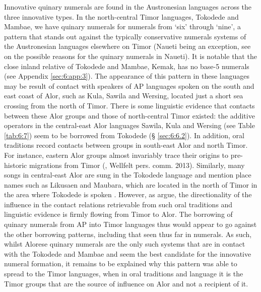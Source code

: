     Innovative quinary numerals are found in the Austronesian languages across the three innovative types. In the north-central Timor languages, Tokodede and Mambae, we have quinary numerals for numerals from `six' through `nine', a pattern that stands out against the typically conservative numerals systems of the Austronesian languages elsewhere on Timor (Naueti being an exception, see \citet{SchapperEtAl2013} on the possible reasons for the quinary numerals in Naueti). It is notable that the close inland relative of Tokodede and Mambae, Kemak, has no base-5 numerals (see Appendix \ref{sec:6:app:3}). The appearance of this pattern in these languages may be result of contact with speakers of AP languages spoken on the south and east coast of Alor, such as Kula, Sawila and Wersing, located just a short sea crossing from the north of Timor. There is some linguistic evidence that contacts between these Alor groups and those of north-central Timor existed: the additive operators in the central-east Alor languages Sawila, Kula and Wersing (see Table \ref{tab:6:7}) seem to be borrowed from Tokodede ({\S} \ref{sec:6:6.2}). In addition, oral traditions record contacts between groups in south-east Alor and north Timor. For instance, eastern Alor groups almost invariably trace their origins to pre-historic migrations from Timor (\citealt{WellfeltEtAl2013}, Wellfelt pers. comm. 2013). Similarly, many songs in central-east Alor are sung in the Tokodede language and mention place names such as Likusaen and Maubara, which are located in the north of Timor in the area where Tokodede is spoken \citep{WellfeltEtAl2013}. However, as \citet{WellfeltEtAl2013} argue, the directionality of the influence in the contact relations retrievable from such oral traditions and linguistic evidence is firmly flowing from Timor to Alor. The borrowing of quinary numerals from AP into Timor languages thus would appear to go against the other borrowing patterns, including that seen thus far in numerals. As such, whilst Alorese quinary numerals are the only such systems that are in contact with the Tokodede and Mambae and seem the best candidate for the innovative numeral formation, it remains to be explained why this pattern was able to spread to the Timor languages, when in oral traditions and language it is the Timor groups that are the source of influence on Alor and not a recipient of it.

